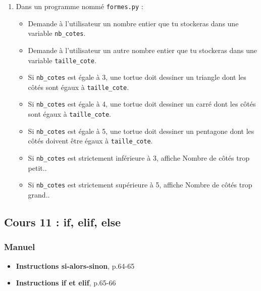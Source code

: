 \documentclass[11pt]{article}
\begin{document}
\begin{enumerate}
\item Dans un programme nommé \texttt{formes.py} :
\begin{itemize}
\item Demande à l'utilisateur un nombre entier que tu stockeras dans une variable \texttt{nb\_cotes}.
\item Demande à l'utilisateur un autre nombre entier que tu stockeras dans une variable \texttt{taille\_cote}.
\item Si \texttt{nb\_cotes} est égale à 3, une tortue doit dessiner un triangle dont les côtés sont égaux à \texttt{taille\_cote}.
\item Si \texttt{nb\_cotes} est égale à 4, une tortue doit dessiner un carré dont les côtés sont égaux à \texttt{taille\_cote}.
\item Si \texttt{nb\_cotes} est égale à 5, une tortue doit dessiner un pentagone dont les côtés doivent être égaux à \texttt{taille\_cote}.
\item Si \texttt{nb\_cotes} est strictement inférieure à 3, affiche \og Nombre de côtés trop petit.\fg{}.
\item Si \texttt{nb\_cotes} est strictement supérieure à 5, affiche \og Nombre de côtés trop grand.\fg{}.
\end{itemize}
\end{enumerate}

\subsection*{Cours 11 : if, elif, else}
\label{chapitre4_cours11}
\subsubsection*{Manuel}
\label{sec:orgdc82fcb}
\begin{itemize}
\item \textbf{\og Instructions si-alors-sinon\fg{}}, p.64-65
\item \textbf{\og Instructions if et elif\fg{}}, p.65-66
\end{itemize}
\end{document}
